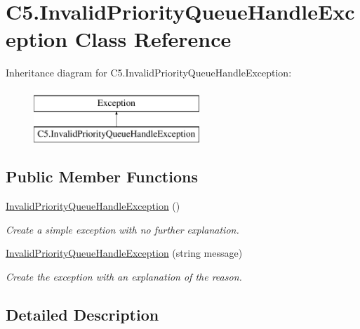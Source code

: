 \hypertarget{class_c5_1_1_invalid_priority_queue_handle_exception}{}\section{C5.\+Invalid\+Priority\+Queue\+Handle\+Exception Class Reference}
\label{class_c5_1_1_invalid_priority_queue_handle_exception}


 


Inheritance diagram for C5.\+Invalid\+Priority\+Queue\+Handle\+Exception\+:\begin{figure}[H]
\begin{center}
\leavevmode
\includegraphics[height=2.000000cm]{class_c5_1_1_invalid_priority_queue_handle_exception}
\end{center}
\end{figure}
\subsection*{Public Member Functions}
\begin{DoxyCompactItemize}
\item 
\hyperlink{class_c5_1_1_invalid_priority_queue_handle_exception_a8fba5a687da5795a34fac7161c4eb2ca}{Invalid\+Priority\+Queue\+Handle\+Exception} ()
\begin{DoxyCompactList}\small\item\em Create a simple exception with no further explanation. \end{DoxyCompactList}\item 
\hyperlink{class_c5_1_1_invalid_priority_queue_handle_exception_ad771a15f55c53824ba32d0663c315c20}{Invalid\+Priority\+Queue\+Handle\+Exception} (string message)
\begin{DoxyCompactList}\small\item\em Create the exception with an explanation of the reason. \end{DoxyCompactList}\end{DoxyCompactItemize}


\subsection{Detailed Description}




